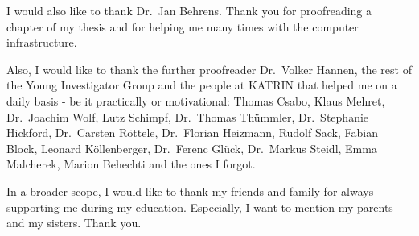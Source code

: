 I would also like to thank Dr.~Jan Behrens. Thank you for proofreading a chapter of my thesis and for helping me many times with the computer infrastructure.


Also, I would like to thank the further proofreader Dr.~Volker Hannen, the rest of the Young Investigator Group and the people at KATRIN that helped me on a daily basis - be it practically or motivational: Thomas Csabo, Klaus Mehret, Dr.~Joachim Wolf, Lutz Schimpf, Dr.~Thomas Thümmler, Dr.~Stephanie Hickford, Dr.~Carsten Röttele, Dr.~Florian Heizmann, Rudolf Sack, Fabian Block, Leonard Köllenberger, Dr.~Ferenc Glück, Dr.~Markus Steidl, Emma Malcherek, Marion Behechti and the ones I forgot. 


In a broader scope, I would like to thank my friends and family for always supporting me during my education. Especially, I want to mention my parents and my sisters. Thank you.